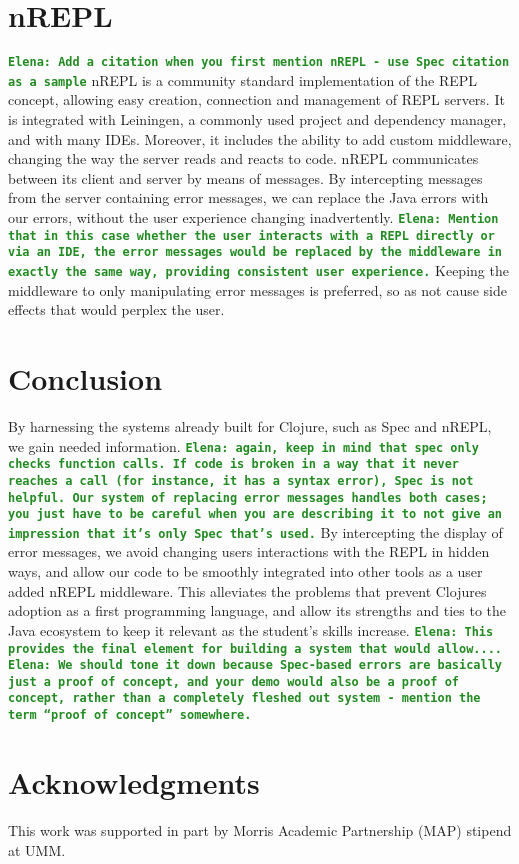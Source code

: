 \documentclass[12pt]{article}
\newcommand{\comment}[1]{{\bf \tt  {#1}}}
\newcommand{\emcomment}[1]{\textcolor{ForestGreen}{\comment{Elena: {#1}}}}
\begin{document}
\section{nREPL}
\emcomment{Add a citation when you first mention nREPL - use Spec citation as a sample}
nREPL is a community standard implementation of the REPL concept,
allowing easy creation, connection and management of REPL servers.
It is integrated with Leiningen, a commonly used project and dependency manager,
 and with many IDEs. Moreover, it includes the ability to add custom middleware,
  changing the way the server reads and reacts to code.
 nREPL communicates between its client and server by means of messages.
 By intercepting messages from the server containing error messages,
 we can replace the Java errors with our errors,
  without the user experience changing inadvertently.
\emcomment{Mention that in this case whether the user interacts with a REPL directly or via an IDE,
the error messages would be replaced by the middleware in exactly the same way, providing consistent 
user experience.}
  Keeping the middleware to only manipulating error messages
  is preferred, so as not cause side effects that would perplex the user.

\section{Conclusion}
By harnessing the systems already built for Clojure,
such as Spec and nREPL, we gain needed information.
\emcomment{again, keep in mind that spec only checks function calls. If code is broken 
in a way that it never reaches a call (for instance, it has a syntax error), Spec is not helpful. 
Our system of replacing error messages handles both cases; you just have to be careful 
when you are describing it to not give an impression that it's only Spec that's used.}
By intercepting the display of error messages, we avoid changing users
interactions with the REPL in hidden ways, and allow our code to
be smoothly integrated into other tools as a user added nREPL middleware.
  This alleviates the problems that prevent Clojures
 adoption as a first programming language, and allow its strengths
 and ties to the Java ecosystem to keep it relevant as the student's skills increase.
\emcomment{This provides the final element for building a system that would allow....}
\emcomment{We should tone it down because Spec-based errors are basically just a proof of concept,
and your demo would also be a proof of concept, rather than a completely fleshed out system - mention the term ``proof of concept'' somewhere.}
 




\section{Acknowledgments}
This work was supported in part by Morris Academic Partnership (MAP) stipend at UMM.




\end{document}
